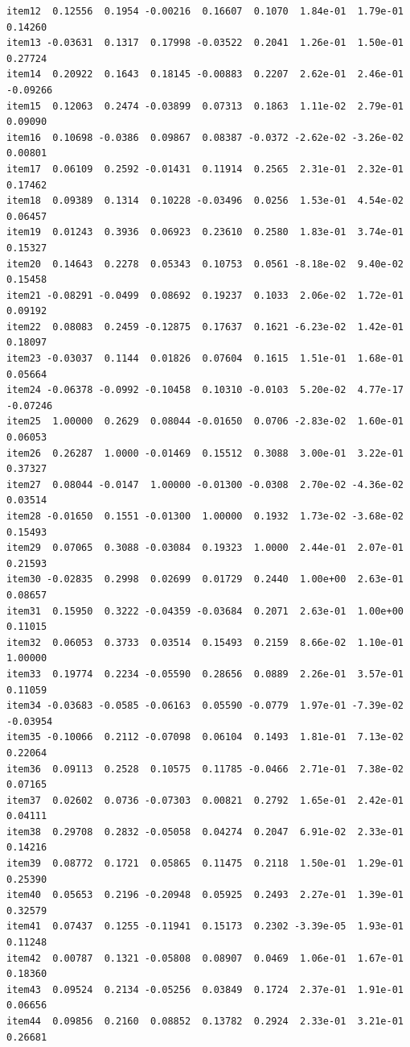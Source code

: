 \documentclass[
  a4paper,
]{ltjsbook}
\begin{document}
\begin{verbatim}
item12  0.12556  0.1954 -0.00216  0.16607  0.1070  1.84e-01  1.79e-01  0.14260
item13 -0.03631  0.1317  0.17998 -0.03522  0.2041  1.26e-01  1.50e-01  0.27724
item14  0.20922  0.1643  0.18145 -0.00883  0.2207  2.62e-01  2.46e-01 -0.09266
item15  0.12063  0.2474 -0.03899  0.07313  0.1863  1.11e-02  2.79e-01  0.09090
item16  0.10698 -0.0386  0.09867  0.08387 -0.0372 -2.62e-02 -3.26e-02  0.00801
item17  0.06109  0.2592 -0.01431  0.11914  0.2565  2.31e-01  2.32e-01  0.17462
item18  0.09389  0.1314  0.10228 -0.03496  0.0256  1.53e-01  4.54e-02  0.06457
item19  0.01243  0.3936  0.06923  0.23610  0.2580  1.83e-01  3.74e-01  0.15327
item20  0.14643  0.2278  0.05343  0.10753  0.0561 -8.18e-02  9.40e-02  0.15458
item21 -0.08291 -0.0499  0.08692  0.19237  0.1033  2.06e-02  1.72e-01  0.09192
item22  0.08083  0.2459 -0.12875  0.17637  0.1621 -6.23e-02  1.42e-01  0.18097
item23 -0.03037  0.1144  0.01826  0.07604  0.1615  1.51e-01  1.68e-01  0.05664
item24 -0.06378 -0.0992 -0.10458  0.10310 -0.0103  5.20e-02  4.77e-17 -0.07246
item25  1.00000  0.2629  0.08044 -0.01650  0.0706 -2.83e-02  1.60e-01  0.06053
item26  0.26287  1.0000 -0.01469  0.15512  0.3088  3.00e-01  3.22e-01  0.37327
item27  0.08044 -0.0147  1.00000 -0.01300 -0.0308  2.70e-02 -4.36e-02  0.03514
item28 -0.01650  0.1551 -0.01300  1.00000  0.1932  1.73e-02 -3.68e-02  0.15493
item29  0.07065  0.3088 -0.03084  0.19323  1.0000  2.44e-01  2.07e-01  0.21593
item30 -0.02835  0.2998  0.02699  0.01729  0.2440  1.00e+00  2.63e-01  0.08657
item31  0.15950  0.3222 -0.04359 -0.03684  0.2071  2.63e-01  1.00e+00  0.11015
item32  0.06053  0.3733  0.03514  0.15493  0.2159  8.66e-02  1.10e-01  1.00000
item33  0.19774  0.2234 -0.05590  0.28656  0.0889  2.26e-01  3.57e-01  0.11059
item34 -0.03683 -0.0585 -0.06163  0.05590 -0.0779  1.97e-01 -7.39e-02 -0.03954
item35 -0.10066  0.2112 -0.07098  0.06104  0.1493  1.81e-01  7.13e-02  0.22064
item36  0.09113  0.2528  0.10575  0.11785 -0.0466  2.71e-01  7.38e-02  0.07165
item37  0.02602  0.0736 -0.07303  0.00821  0.2792  1.65e-01  2.42e-01  0.04111
item38  0.29708  0.2832 -0.05058  0.04274  0.2047  6.91e-02  2.33e-01  0.14216
item39  0.08772  0.1721  0.05865  0.11475  0.2118  1.50e-01  1.29e-01  0.25390
item40  0.05653  0.2196 -0.20948  0.05925  0.2493  2.27e-01  1.39e-01  0.32579
item41  0.07437  0.1255 -0.11941  0.15173  0.2302 -3.39e-05  1.93e-01  0.11248
item42  0.00787  0.1321 -0.05808  0.08907  0.0469  1.06e-01  1.67e-01  0.18360
item43  0.09524  0.2134 -0.05256  0.03849  0.1724  2.37e-01  1.91e-01  0.06656
item44  0.09856  0.2160  0.08852  0.13782  0.2924  2.33e-01  3.21e-01  0.26681

\end{verbatim}
\end{document}
